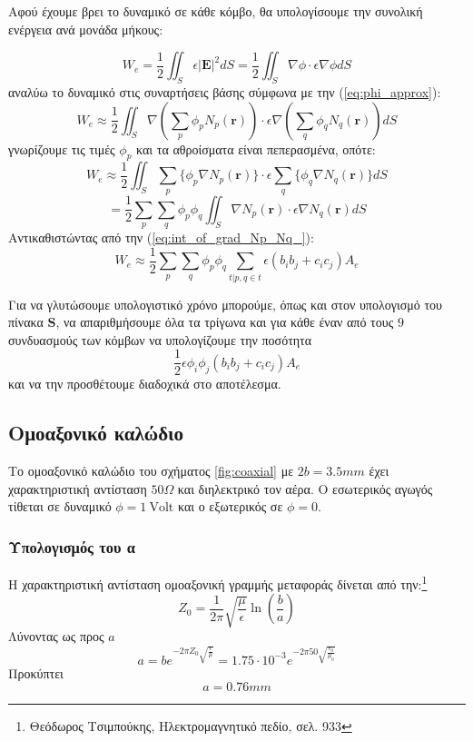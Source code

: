 \documentclass[10pt, letterpaper]{article}
\newcommand{\en}{\selectlanguage{english}}
\newcommand{\gr}{\selectlanguage{greek}}
\begin{document}
Αφού έχουμε βρει το δυναμικό σε κάθε κόμβο, θα υπολογίσουμε την συνολική ενέργεια ανά μονάδα μήκους:

\begin{equation}   \label{eq:We}
  W_e = \frac{1}{2} \iint_S \epsilon |\mathbf{E}|^2dS = \frac{1}{2} \iint_S  \nabla \phi  \cdot \epsilon \nabla \phi dS
\end{equation}
αναλύω το δυναμικό στις συναρτήσεις βάσης σύμφωνα με την (\ref{eq:phi_approx}):
\[W_e \approx \frac{1}{2} \iint_S \nabla (\sum_p \phi_p N_p(\mathbf{r}))  \cdot \epsilon  \nabla (\sum_q \phi_q N_q(\mathbf{r})) dS\]
γνωρίζουμε τις τιμές $\phi_p$ και τα αθροίσματα είναι πεπερασμένα, οπότε:
\[ W_e \approx  \frac{1}{2}  \iint_S  \sum_p \{ \phi_p \nabla N_p(\mathbf{r}) \} \cdot  \epsilon \sum_q \{ \phi_q \nabla N_q(\mathbf{r}) \} dS\]
\[ = \frac{1}{2}   \sum_p \sum_q  \phi_p \phi_q \iint_S \nabla N_p(\mathbf{r})  \cdot \epsilon \nabla N_q(\mathbf{r})  dS \]
Αντικαθιστώντας από την (\ref{eq:int_of_grad_Np_Nq_}):
\[ W_e \approx \frac{1}{2}  \sum_p \sum_{q}  \phi_p \phi_q   \sum_{t | p,q \in t} \epsilon  (b_ib_j + c_ic_j) A_e  \]

Για να γλυτώσουμε υπολογιστικό χρόνο μπορούμε, όπως και στον υπολογισμό του πίνακα $\mathbf{S}$, να απαριθμήσουμε όλα τα 
τρίγωνα και για κάθε έναν από τους $9$ συνδυασμούς των κόμβων να υπολογίζουμε την ποσότητα 
\[ \frac{1}{2} \epsilon  \phi_i \phi_j  (b_ib_j + c_ic_j) A_e   \]
και να την προσθέτουμε διαδοχικά στο αποτέλεσμα. 












\subsection*{Ομοαξονικό καλώδιο}

Το ομοαξονικό καλώδιο του σχήματος \ref{fig:coaxial} με $2b = 3.5 mm $ έχει χαρακτηριστική αντίσταση $50 \Omega$ και διηλεκτρικό 
τον αέρα. Ο εσωτερικός αγωγός τίθεται σε δυναμικό \en $\phi = 1 \ \text{Volt}$ \gr και ο εξωτερικός σε $\phi = 0$.

\subsubsection*{Υπολογισμός του α}


Η χαρακτηριστική αντίσταση ομοαξονική γραμμής μεταφοράς δίνεται από την:\footnote{Θεόδωρος Τσιμπούκης, Ηλεκτρομαγνητικό πεδίο, σελ. 933}
\[ Z_0 = \frac{1}{2 \pi}\sqrt{\frac{\mu}{\epsilon}} \ln (\frac{b}{a})  \]
Λύνοντας ως προς $a$
\[ a = b e^{-2\pi Z_0 \sqrt{\frac{\epsilon}{\mu}}}  = 1.75 \cdot 10^{-3} e^{-2\pi 50 \sqrt{\frac{\epsilon_0}{\mu_0}}}\]
Προκύπτει
\[a = 0.76 mm\]
\end{document}
